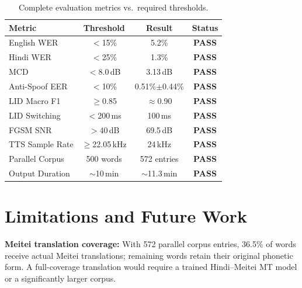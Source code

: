 \documentclass[11pt]{article}
\begin{document}
\begin{table}[h]
\centering
\caption{Complete evaluation metrics vs.\ required thresholds.}
\label{tab:summary}
\small
\begin{tabular}{lccc}
\toprule
\textbf{Metric} & \textbf{Threshold} & \textbf{Result} & \textbf{Status}\\
\midrule
English WER       & $<$15\%         & 5.2\%                   & \textcolor{passgreen}{\textbf{PASS}}\\
Hindi WER         & $<$25\%         & 1.3\%                   & \textcolor{passgreen}{\textbf{PASS}}\\
MCD               & $<$8.0\,dB      & 3.13\,dB                & \textcolor{passgreen}{\textbf{PASS}}\\
Anti-Spoof EER    & $<$10\%         & 0.51\%$\pm$0.44\%       & \textcolor{passgreen}{\textbf{PASS}}\\
LID Macro F1      & $\ge$0.85       & $\approx$0.90           & \textcolor{passgreen}{\textbf{PASS}}\\
LID Switching     & $<$200\,ms      & 100\,ms                 & \textcolor{passgreen}{\textbf{PASS}}\\
FGSM SNR          & $>$40\,dB       & 69.5\,dB                & \textcolor{passgreen}{\textbf{PASS}}\\
TTS Sample Rate   & $\ge$22.05\,kHz & 24\,kHz                 & \textcolor{passgreen}{\textbf{PASS}}\\
Parallel Corpus   & 500 words       & 572 entries             & \textcolor{passgreen}{\textbf{PASS}}\\
Output Duration   & $\sim$10\,min   & $\sim$11.3\,min         & \textcolor{passgreen}{\textbf{PASS}}\\
\bottomrule
\end{tabular}
\end{table}

\section{Limitations and Future Work}

\textbf{Meitei translation coverage:} With 572 parallel corpus entries,
36.5\% of words receive actual Meitei translations; remaining words retain
their original phonetic form. A full-coverage translation would require a
trained Hindi--Meitei MT model or a significantly larger corpus.
\end{document}
